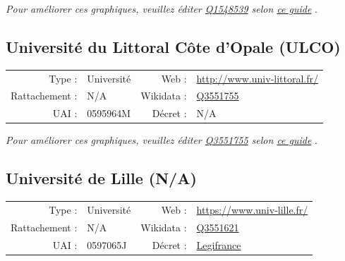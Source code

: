 \documentclass[12pt,french,landscape]{article}
\begin{document}
\textit{\scriptsize Pour améliorer ces graphiques, veuillez éditer \href{https://www.wikidata.org/entity/Q1548539}{Q1548539}  selon \href{https://github.com/cpesr/wikidataESR/blob/master/Rmd/wikidataESR.md}{ce guide}}
.


\newpage

\hypertarget{universituxe9-du-littoral-cuxf4te-dopale-ulco}{%
\subsection{Université du Littoral Côte d'Opale
(ULCO)}\label{universituxe9-du-littoral-cuxf4te-dopale-ulco}}

\begin{tabular*}{0.45\textwidth}{rp{2cm}rl}  
\hline  
Type : & Université & Web : &\href{http://www.univ-littoral.fr/}{http://www.univ-littoral.fr/} \\  
Rattachement : & N/A & Wikidata : & \href{https://www.wikidata.org/entity/Q3551755}{Q3551755} \\  
UAI : & 0595964M & Décret : & N/A \\  
\hline  
\end{tabular*}

\textit{\scriptsize Pour améliorer ces graphiques, veuillez éditer \href{https://www.wikidata.org/entity/Q3551755}{Q3551755}  selon \href{https://github.com/cpesr/wikidataESR/blob/master/Rmd/wikidataESR.md}{ce guide}}
.


\newpage

\hypertarget{universituxe9-de-lille-na}{%
\subsection{Université de Lille (N/A)}\label{universituxe9-de-lille-na}}

\begin{tabular*}{0.45\textwidth}{rp{2cm}rl}  
\hline  
Type : & Université & Web : &\href{https://www.univ-lille.fr/}{https://www.univ-lille.fr/} \\  
Rattachement : & N/A & Wikidata : & \href{https://www.wikidata.org/entity/Q3551621}{Q3551621} \\  
UAI : & 0597065J & Décret : & \href{https://www.legifrance.gouv.fr/affichTexte.do?cidTexte=JORFTEXT000035543008}{Legifrance} \\  
\hline  
\end{tabular*}
\end{document}
